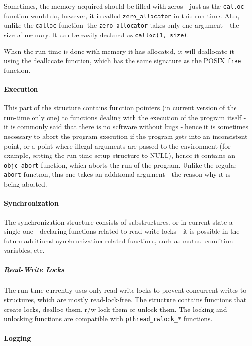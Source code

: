 Sometimes, the memory acquired should be filled with zeros - just as the \verb=calloc= function would do, however, it is called \verb=zero_allocator= in this run-time. Also, unlike the \verb=calloc= function, the \verb=zero_allocator= takes only one argument - the size of memory. It can be easily declared as \verb=calloc(1, size)=.

When the run-time is done with memory it has allocated, it will deallocate it using the deallocate function, which has the same signature as the POSIX \verb=free= function.

\paragraph{Execution}

This part of the structure contains function pointers (in current version of the run-time only one) to functions dealing with the execution of the program itself - it is commonly said that there is no software without bugs - hence it is sometimes necessary to abort the program execution if the program gets into an inconsistent point, or a point where illegal arguments are passed to the environment (for example, setting the run-time setup structure to NULL), hence it contains an \verb=objc_abort= function, which aborts the run of the program. Unlike the regular \verb=abort= function, this one takes an additional argument - the reason why it is being aborted.

\paragraph{Synchronization}

The synchronization structure consists of substructures, or in current state a single one - declaring functions related to read-write locks - it is possible in the future additional synchronization-related functions, such as mutex, condition variables, etc.

\subparagraph{Read-Write Locks} The run-time currently uses only read-write locks to prevent concurrent writes to structures, which are mostly read-lock-free. The structure contains functions that create locks, dealloc them, r/w lock them or unlock them. The locking and unlocking functions are compatible with \newline{}\verb=pthread_rwlock_*= functions.

\paragraph{Logging}

